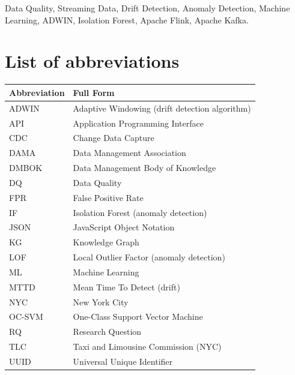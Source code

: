 \documentclass[a4paper, reqno, oneside]{book}
\begin{document}
\vspace{2cm}
 Data Quality, Streaming Data, Drift Detection, Anomaly Detection, Machine Learning, ADWIN, Isolation Forest, Apache Flink, Apache Kafka.

\newpage
\tableofcontents

\newpage
\listoffigures

\newpage
\listoftables


\chapter*{List of abbreviations}
\vspace{20pt}

\begin{longtable}{|m{2.5cm}|m{10cm}|}
\hline
\textbf{Abbreviation} & \textbf{Full Form} \\ \hline
ADWIN & Adaptive Windowing (drift detection algorithm) \\ \hline
API & Application Programming Interface \\ \hline
CDC & Change Data Capture \\ \hline
DAMA & Data Management Association \\ \hline
DMBOK & Data Management Body of Knowledge \\ \hline
DQ & Data Quality \\ \hline
FPR & False Positive Rate \\ \hline
IF & Isolation Forest (anomaly detection) \\ \hline
JSON & JavaScript Object Notation \\ \hline
KG & Knowledge Graph \\ \hline
LOF & Local Outlier Factor (anomaly detection) \\ \hline
ML & Machine Learning \\ \hline
MTTD & Mean Time To Detect (drift) \\ \hline
NYC & New York City \\ \hline
OC-SVM & One-Class Support Vector Machine \\ \hline
RQ & Research Question \\ \hline
TLC & Taxi and Limousine Commission (NYC) \\ \hline
UUID & Universal Unique Identifier \\ \hline
\end{longtable}


\mainmatter


\end{document}
